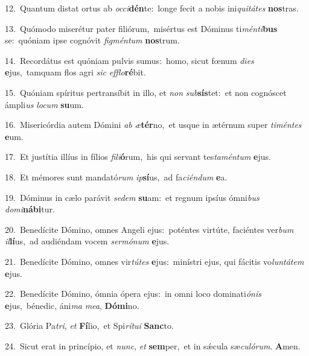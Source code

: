 {\numbfont\textcolor{\numbcolor}{12.}}~Quantum distat ortus ab \textit{oc}\-\textit{ci}\textbf{dén}te:~\star longe fecit a nobis ini\-\textit{qui}\-\textit{tá}\textit{tes} \textbf{nos}\-tras.\par
{\numbfont\textcolor{\numbcolor}{13.}}~Quómodo miserétur pater filiórum,~\dagger misértus est Dóminus ti\-\textit{mén}\-\textit{ti}\textbf{bus} se:~\star quóniam ipse cognóvit \textit{fig}\-\textit{mén}\textit{tum} \textbf{nos}\-trum.\par
{\numbfont\textcolor{\numbcolor}{14.}}~Recordátus est quóniam pulvis sumus:~\dagger homo, sicut fœnum \textit{di}\-\textit{es} \textbf{e}\-jus,~\star tamquam flos agri \textit{sic} \textit{ef}\-\textit{flo}\textbf{ré}bit.\par
{\numbfont\textcolor{\numbcolor}{15.}}~Quóniam spíritus pertransíbit in illo, et \textit{non} \textit{sub}\-\textbf{sís}tet:~\star et non cognóscet ámpli\textit{us} \textit{lo}\-\textit{cum} \textbf{su}\-um.\par
{\numbfont\textcolor{\numbcolor}{16.}}~Misericórdia autem Dómini \textit{ab} \textit{æ}\-\textbf{tér}no,~\star et usque in ætérnum super \textit{ti}\-\textit{mén}\textit{tes} \textbf{e}\-um.\par
{\numbfont\textcolor{\numbcolor}{17.}}~Et justítia illíus in fílios \textit{fi}\-\textit{li}\textbf{ó}rum,~\star his qui servant tes\-\textit{ta}\-\textit{mén}\textit{tum} \textbf{e}\-jus.\par
{\numbfont\textcolor{\numbcolor}{18.}}~Et mémores sunt mandató\textit{rum} \textit{ip}\-\textbf{sí}us,~\star ad fa\-\textit{ci}\-\textit{én}\textit{dum} \textbf{e}\-a.\par
{\numbfont\textcolor{\numbcolor}{19.}}~Dóminus in cælo parávit \textit{se}\-\textit{dem} \textbf{su}\-am:~\star et regnum ipsíus ómni\textit{bus} \textit{do}\-\textit{mi}\textbf{ná}\textbf{bi}tur.\par
{\numbfont\textcolor{\numbcolor}{20.}}~Benedícite Dómino, omnes Angeli ejus:~\dagger poténtes virtúte, faciéntes ver\textit{bum} \textit{il}\-\textbf{lí}us,~\star ad audiéndam vocem \textit{ser}\-\textit{mó}\textit{num} \textbf{e}\-jus.\par
{\numbfont\textcolor{\numbcolor}{21.}}~Benedícite Dómino, omnes vir\-\textit{tú}\-\textit{tes} \textbf{e}\-jus:~\star minístri ejus, qui fácitis vo\-\textit{lun}\-\textit{tá}\textit{tem} \textbf{e}\-jus.\par
{\numbfont\textcolor{\numbcolor}{22.}}~Benedícite Dómino, ómnia ópera ejus:~\dagger in omni loco dominati\-\textit{ó}\-\textit{nis} \textbf{e}\-jus,~\star bénedic, áni\textit{ma} \textit{me}\-\textit{a}, \textbf{Dó}\-\textbf{mi}no.\par
{\numbfont\textcolor{\numbcolor}{23.}}~Glória Pa\-\textit{tri}\-, \textit{et} \textbf{Fí}\-lio,~\star et Spi\-\textit{rí}\-\textit{tu}\textit{i} \textbf{Sanc}\-to.\par
{\numbfont\textcolor{\numbcolor}{24.}}~Sicut erat in princípio, et \textit{nunc}\-, \textit{et} \textbf{sem}\-per,~\star et in sǽcula sæ\-\textit{cu}\-\textit{ló}\textit{rum}. \textbf{A}\-men.\par
